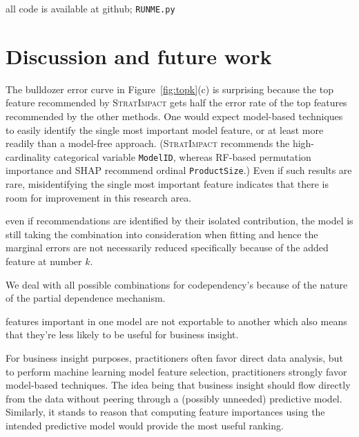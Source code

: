 \documentclass[11pt]{article}
\newcommand{\figref}[1]{Figure~\ref{#1}}
\newcommand{\todo}[1]{{{\color{red}{[#1]}}}}
\newcommand{\simp}{\fontfamily{cmr}\textsc{\small StratImpact}}
\begin{document}
all code is available at github; {\tt\small RUNME.py}

\todo{an experiment where we show insensitive to noise column and any other codependent ones that are thrown in but don't affect y}

\todo{what about outlier example}

\todo{stability is valuable. users would not trust results that changed significantly for small data set changes. show our error bars from bootstrapping}

\section{Discussion and future work}

The bulldozer error curve in \figref{fig:topk}(c) is surprising because the top feature recommended by \simp{} gets half the error rate of the top features recommended by the other methods. One would expect model-based techniques to easily identify the single most important model feature, or at least more readily than a model-free approach.  (\simp{} recommends the high-cardinality categorical variable {\tt ModelID}, whereas RF-based permutation importance and SHAP recommend ordinal {\tt ProductSize}.)  Even if such results are rare, misidentifying the single most important feature indicates that there is room for improvement in this research area.

even if recommendations are identified by their isolated contribution, the model is still taking the combination into consideration when fitting and hence the marginal errors are not necessarily reduced specifically because of the added feature at number $k$.

\todo{We need min samples per x to avoid left edge issues as they skew entire pdp, which severely skews mass AUC.}

We deal with all possible combinations for codependency's because of the nature of the partial dependence mechanism.

features important in one model are not exportable to another which also means that they're less likely to be useful for business insight.
 
For business insight purposes, practitioners often favor direct data analysis, but to perform machine learning model feature selection, practitioners strongly favor model-based techniques. The idea being that business insight should flow directly from the data without peering through a (possibly unneeded) predictive model.  Similarly, it stands to reason that computing feature importances using the intended predictive model would provide the most useful ranking.
\end{document}
